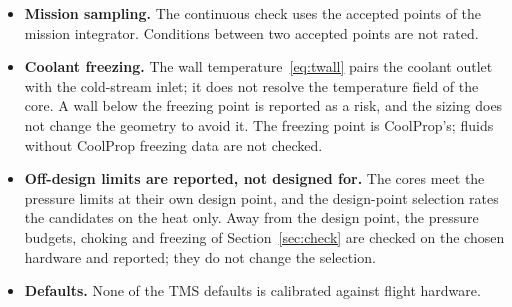 \documentclass[a4paper,11pt]{article}
\begin{document}
\begin{itemize}
  inertia and control are not modelled.
\item \textbf{Mission sampling.} The continuous check uses the accepted points of the
  mission integrator. Conditions between two accepted points are not rated.
\item \textbf{Coolant freezing.} The wall temperature~\eqref{eq:twall} pairs the coolant
  outlet with the cold-stream inlet; it does not resolve the temperature field of the core.
  A wall below the freezing point is reported as a risk, and the sizing does not change the
  geometry to avoid it. The freezing point is CoolProp's; fluids without CoolProp freezing data are
  not checked.
\item \textbf{Off-design limits are reported, not designed for.} The cores meet the
  pressure limits at their own design point, and the design-point selection rates the
  candidates on the heat only. Away from the design point, the pressure budgets, choking and
  freezing of Section~\ref{sec:check} are checked on the chosen hardware and reported; they
  do not change the selection.
\item \textbf{Defaults.} None of the TMS defaults is calibrated against flight hardware.
\end{itemize}
\end{document}
